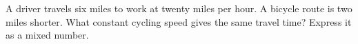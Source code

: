 A driver travels six miles to work at twenty miles per hour. A bicycle route is two miles shorter. What constant cycling speed gives the same travel time? Express it as a mixed number.
